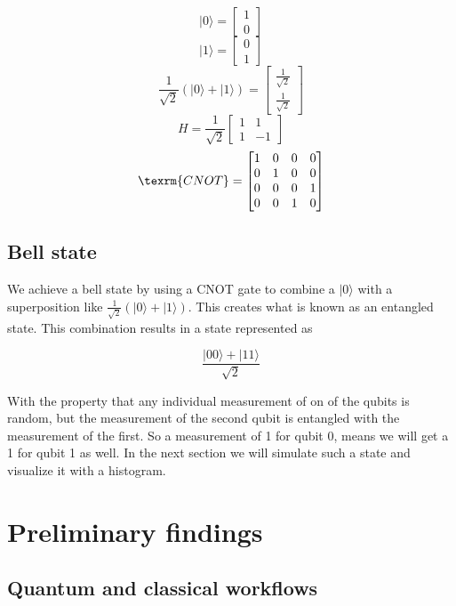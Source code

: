 \documentclass{article}
\newcommand{\ket}[1]{{\lvert #1 \rangle}}
\begin{document}
$$
\ket{0} = 
\begin{bmatrix}
1 \\
0
\end{bmatrix}
$$
$$
\ket{1} =
\begin{bmatrix}
0 \\
1
\end{bmatrix}
$$
$$
\frac{1}{\sqrt{2}}(\ket{0}+\ket{1}) = 
\begin{bmatrix}
    \frac{1}{\sqrt{2}}\\
    \frac{1}{\sqrt{2}}
\end{bmatrix}
$$
$$
H = \frac{1}{\sqrt{2}}
\begin{bmatrix}
    1 & 1 \\
    1 & -1
\end{bmatrix}
$$
$$
\texrm{CNOT} =
\left[\begin{matrix}1 & 0 & 0 & 0\\0 & 1 & 0 & 0\\0 & 0 & 0 & 1\\0 & 0 & 1 & 0\end{matrix}\right]
$$
\subsection{Bell state}

We achieve a bell state by using a CNOT gate to combine a $\ket{0}$ with a superposition like 
$\frac{1}{\sqrt{2}}(\ket{0}+\ket{1})$. This creates what is known as an entangled state. This combination results in a state represented as 

$$
\frac{\ket{00}+\ket{11}}{\sqrt{2}}
$$

With the property that any individual measurement of on of the qubits is random, but the measurement of the second qubit is entangled with the measurement of the first. So a measurement of 1 for qubit 0, means we will get a 1 for qubit 1 as well. In the next section we will simulate such a state and visualize it with a histogram.




\section{Preliminary findings}

\subsection{Quantum and classical workflows}
\end{document}
